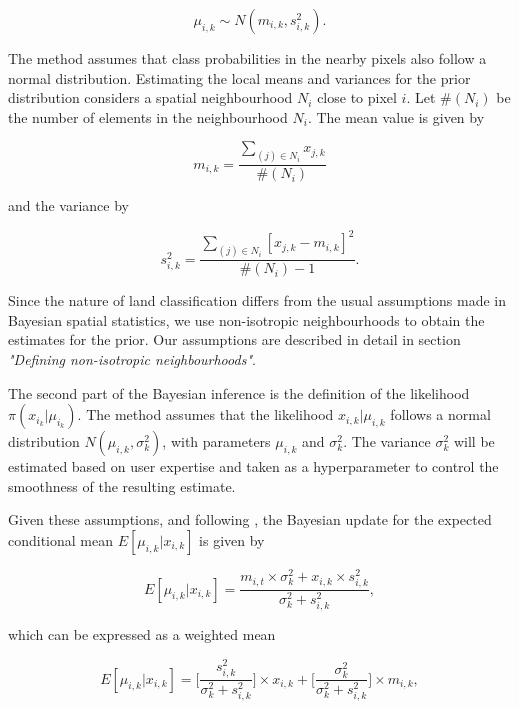 \documentclass[
  shortnames]{jss}
\begin{document}
\begin{equation}
    \mu_{i,k} \sim N(m_{i,k}, s^2_{i,k}).
\end{equation}

The method assumes that class probabilities in the nearby pixels also follow a normal distribution. Estimating the local means and variances for the prior distribution considers a spatial neighbourhood \(N_{i}\) close to pixel \(i\). Let \(\#(N_{i})\) be the number of elements in the neighbourhood \(N_{i}\). The mean value is given by

\begin{equation}
m_{i,k} = \frac{\sum_{(j) \in N_{i}} x_{j,k}}{\#(N_{i})}
\end{equation}

and the variance by

\begin{equation}
s^2_{i,k} = \frac{\sum_{(j) \in N_{i}} [x_{j,k} - m_{i,k}]^2}{\#(N_{i})-1}.
\end{equation}

Since the nature of land classification differs from the usual assumptions made in Bayesian spatial statistics, we use non-isotropic neighbourhoods to obtain the estimates for the prior. Our assumptions are described in detail in section \textit{"Defining non-isotropic neighbourhoods"}.

The second part of the Bayesian inference is the definition of the likelihood \(\pi(x_{i_k}|\mu_{i_k})\). The method assumes that the likelihood \(x_{i,k} | \mu_{i,k}\) follows a normal distribution \(N(\mu_{i,k}, \sigma^2_{k})\), with parameters \(\mu_{i,k}\) and \(\sigma^2_{k}\). The variance \(\sigma^2_{k}\) will be estimated based on user expertise and taken as a hyperparameter to control the smoothness of the resulting estimate.

Given these assumptions, and following \citet{Gelman2014}, the Bayesian update for the expected conditional mean \({E}[\mu_{i,k} | x_{i,k}]\) is given by

\begin{equation}
{E}[\mu_{i,k} | x_{i,k}] = \frac{m_{i,t} \times \sigma^2_{k} +
x_{i,k} \times s^2_{i,k}}{ \sigma^2_{k} +s^2_{i,k}},
\end{equation}

which can be expressed as a weighted mean

\begin{equation}
{E}[\mu_{i,k} | x_{i,k}] =
\Biggl [ \frac{s^2_{i,k}}{\sigma^2_{k} +s^2_{i,k}} \Biggr ] \times
x_{i,k} +
\Biggl [ \frac{\sigma^2_{k}}{\sigma^2_{k} +s^2_{i,k}} \Biggr ] \times m_{i,k},
\end{equation}
\end{document}
